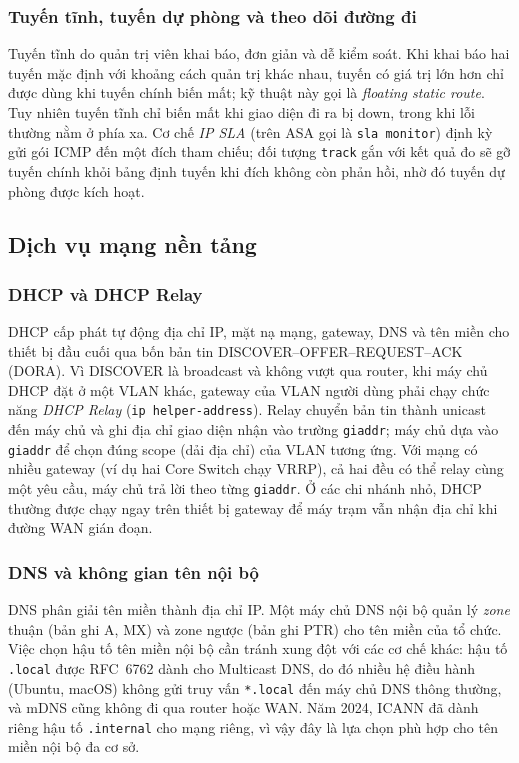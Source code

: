 \subsubsection{Tuyến tĩnh, tuyến dự phòng và theo dõi đường đi}

Tuyến tĩnh do quản trị viên khai báo, đơn giản và dễ kiểm soát. Khi khai báo hai tuyến mặc định với khoảng cách quản trị khác nhau, tuyến có giá trị lớn hơn chỉ được dùng khi tuyến chính biến mất; kỹ thuật này gọi là \textit{floating static route}. Tuy nhiên tuyến tĩnh chỉ biến mất khi giao diện đi ra bị down, trong khi lỗi thường nằm ở phía xa. Cơ chế \textit{IP SLA} (trên ASA gọi là \texttt{sla monitor}) định kỳ gửi gói ICMP đến một đích tham chiếu; đối tượng \texttt{track} gắn với kết quả đo sẽ gỡ tuyến chính khỏi bảng định tuyến khi đích không còn phản hồi, nhờ đó tuyến dự phòng được kích hoạt.

\subsection{Dịch vụ mạng nền tảng}

\subsubsection{DHCP và DHCP Relay}

DHCP cấp phát tự động địa chỉ IP, mặt nạ mạng, gateway, DNS và tên miền cho thiết bị đầu cuối qua bốn bản tin DISCOVER--OFFER--REQUEST--ACK (DORA). Vì DISCOVER là broadcast và không vượt qua router, khi máy chủ DHCP đặt ở một VLAN khác, gateway của VLAN người dùng phải chạy chức năng \textit{DHCP Relay} (\texttt{ip helper-address}). Relay chuyển bản tin thành unicast đến máy chủ và ghi địa chỉ giao diện nhận vào trường \texttt{giaddr}; máy chủ dựa vào \texttt{giaddr} để chọn đúng scope (dải địa chỉ) của VLAN tương ứng. Với mạng có nhiều gateway (ví dụ hai Core Switch chạy VRRP), cả hai đều có thể relay cùng một yêu cầu, máy chủ trả lời theo từng \texttt{giaddr}. Ở các chi nhánh nhỏ, DHCP thường được chạy ngay trên thiết bị gateway để máy trạm vẫn nhận địa chỉ khi đường WAN gián đoạn.

\subsubsection{DNS và không gian tên nội bộ}

DNS phân giải tên miền thành địa chỉ IP. Một máy chủ DNS nội bộ quản lý \textit{zone} thuận (bản ghi A, MX) và zone ngược (bản ghi PTR) cho tên miền của tổ chức. Việc chọn hậu tố tên miền nội bộ cần tránh xung đột với các cơ chế khác: hậu tố \texttt{.local} được RFC~6762 dành cho Multicast DNS, do đó nhiều hệ điều hành (Ubuntu, macOS) không gửi truy vấn \texttt{*.local} đến máy chủ DNS thông thường, và mDNS cũng không đi qua router hoặc WAN. Năm 2024, ICANN đã dành riêng hậu tố \texttt{.internal} cho mạng riêng, vì vậy đây là lựa chọn phù hợp cho tên miền nội bộ đa cơ sở.


